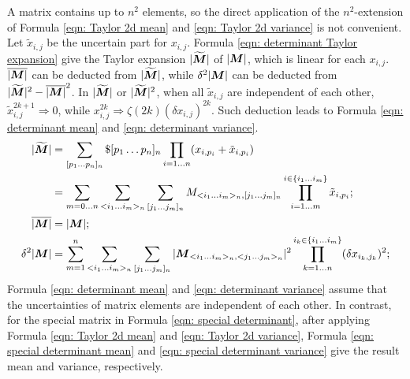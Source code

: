 \documentclass[twoside]{article}
\numberwithin{equation}{section}
\begin{document}
A matrix contains up to $n^2$ elements, so the direct application of the $n^2$-extension of Formula \eqref{eqn: Taylor 2d mean} and \eqref{eqn: Taylor 2d variance} is not convenient.
Let $\tilde{x}_{i,j}$ be the uncertain part for $x_{i,j}$.
Formula \eqref{eqn: determinant Taylor expansion} give the Taylor expansion $|\widetilde{\protect{\textrm{\boldmath $M$}}}|$ of $|\protect{\textrm{\boldmath $M$}}|$, which is linear for each $x_{i,j}$.
$\overline{|\protect{\textrm{\boldmath $M$}}|}$ can be deducted from $|\widetilde{\protect{\textrm{\boldmath $M$}}}|$, while $\delta^2 |\protect{\textrm{\boldmath $M$}}|$ can be deducted from $|\widetilde{\protect{\textrm{\boldmath $M$}}}|^2 - \overline{|\protect{\textrm{\boldmath $M$}}|}^2$.
In $|\widetilde{\protect{\textrm{\boldmath $M$}}}|$ or $|\widetilde{\protect{\textrm{\boldmath $M$}}}|^2$, when all $\tilde{x}_{i,j}$ are independent of each other, $\tilde{x}_{i,j}^{2k+1} \Rightarrow 0$, while $x_{i,j}^{2k} \Rightarrow \zeta(2k) (\delta x_{i,j})^{2k}$.
Such deduction leads to Formula \eqref{eqn: determinant mean} and \eqref{eqn: determinant variance}.
\begin{align}
\label{eqn: determinant Taylor expansion}
|\widetilde{\protect{\textrm{\boldmath $M$}}}| &= \sum_{[p_1\dots p_n]_n} \$ [p_1\dots p_n]_n  \prod_{i=1 \dots n} (x_{i,p_i} + \tilde{x}_{i,p_{i}}) \\
	&= \sum_{m=0 \dots n} \sum_{<i_1 \dots i_m>_n} \sum_{[j_1 \dots j_{m}]_n} 
		M_{<i_1 \dots i_m>_n, [j_1 \dots j_{m}]_n} \prod_{i=1 \dots m}^{i \in \{i_1 \dots i_m\}} \tilde{x}_{i,p_{i}}; \nonumber \\
\label{eqn: determinant mean}
\overline{|\protect{\textrm{\boldmath $M$}}|} &= |\protect{\textrm{\boldmath $M$}}|; \\
\label{eqn: determinant variance}
\delta^2 |\protect{\textrm{\boldmath $M$}}| &= \sum_{m=1}^{n} \sum_{<i_1 \dots i_m>_n} \sum_{[j_1 \dots j_m]_n}
  	|\protect{\textrm{\boldmath $M$}} _{<i_1 \dots i_m>_n, <j_1 \dots j_m>_n}|^2 \prod _{k=1 \dots n}^{i_k \in \{i_1 \dots i_m\}} (\delta x_{i_k, j_k})^2; 
\end{align}
Formula \eqref{eqn: determinant mean} and \eqref{eqn: determinant variance} assume that the uncertainties of matrix elements are independent of each other.
In contrast, for the special matrix in Formula \eqref{eqn: special determinant}, after applying Formula \eqref{eqn: Taylor 2d mean} and \eqref{eqn: Taylor 2d variance}, Formula \eqref{eqn: special determinant mean} and \eqref{eqn: special determinant variance} give the result mean and variance, respectively. 
\end{document}
